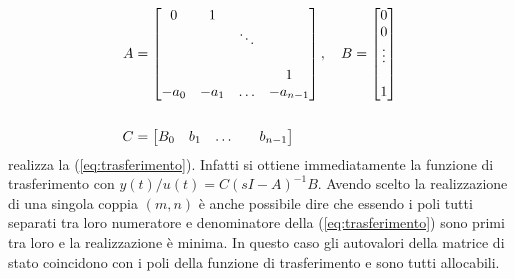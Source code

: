 \begin{align}
 A &= \left[ \begin{matrix} 0 & 1 && \\ &&\ddots \\ \\ &&&1 \\ -a_0 & -a_1 & \hdots & -a_{n-1} \end{matrix} \right],\quad B = \left[ \begin{matrix} 0\\ 0\\ \vdots \\ \\ 1 \end{matrix} \right] \\ \nonumber
 \\ C &= \left[ \begin{matrix} B_0& b_1& \hdots & & b_{n-1} \end{matrix} \right] \nonumber
\end{align}
realizza la (\ref{eq:trasferimento}). Infatti si ottiene immediatamente
la funzione di trasferimento con $y(t)/u(t) = C(sI-A)^{-1}B$. Avendo
scelto la realizzazione di una singola coppia $(m,n)$ è anche possibile
dire che essendo i poli tutti separati tra loro numeratore e
denominatore della (\ref{eq:trasferimento}) sono primi tra loro e la
realizzazione è minima. In questo caso gli autovalori della matrice di
stato coincidono con i poli della funzione di trasferimento e sono tutti
allocabili.


